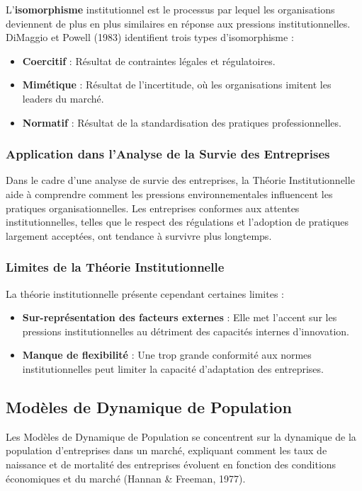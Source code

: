 \documentclass[a4paper,12pt]{report}
\begin{document}
L'\textbf{isomorphisme} institutionnel est le processus par lequel les organisations deviennent de plus en plus similaires en réponse aux pressions institutionnelles. DiMaggio et Powell (1983) identifient trois types d'isomorphisme :
\begin{itemize}
    \item \textbf{Coercitif} : Résultat de contraintes légales et régulatoires.
    \item \textbf{Mimétique} : Résultat de l'incertitude, où les organisations imitent les leaders du marché.
    \item \textbf{Normatif} : Résultat de la standardisation des pratiques professionnelles.
\end{itemize}

\subsubsection{Application dans l'Analyse de la Survie des Entreprises}

Dans le cadre d'une analyse de survie des entreprises, la Théorie Institutionnelle aide à comprendre comment les pressions environnementales influencent les pratiques organisationnelles. Les entreprises conformes aux attentes institutionnelles, telles que le respect des régulations et l'adoption de pratiques largement acceptées, ont tendance à survivre plus longtemps.

\subsubsection{Limites de la Théorie Institutionnelle}

La théorie institutionnelle présente cependant certaines limites :
\begin{itemize}
    \item \textbf{Sur-représentation des facteurs externes} : Elle met l'accent sur les pressions institutionnelles au détriment des capacités internes d'innovation.
    \item \textbf{Manque de flexibilité} : Une trop grande conformité aux normes institutionnelles peut limiter la capacité d'adaptation des entreprises.
\end{itemize}

\subsection{Modèles de Dynamique de Population}
Les Modèles de Dynamique de Population se concentrent sur la dynamique de la population d’entreprises dans un marché, expliquant comment les taux de naissance et de mortalité des entreprises évoluent en fonction des conditions économiques et du marché (Hannan \& Freeman, 1977).
\end{document}
